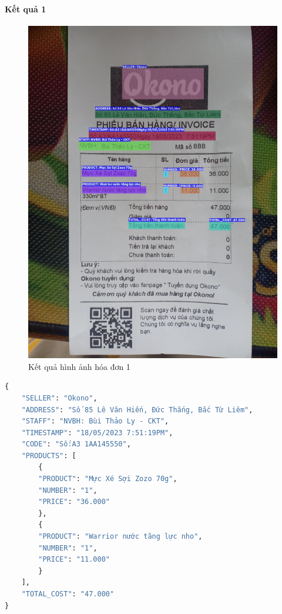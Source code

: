 \paragraph*{Kết quả 1}
\begin{figure}[h]
    \includegraphics[scale=0.2]{images/dem-image.png}
    \centering
    \caption{Kết quả hình ảnh hóa đơn 1}
\end{figure}

\begin{lstlisting}[language=Python]
{
    "SELLER": "Okono",
    "ADDRESS": "Số 85 Lê Văn Hiến, Đức Thắng, Bắc Từ Liêm",
    "STAFF": "NVBH: Bùi Thảo Ly - CKT",
    "TIMESTAMP": "18/05/2023 7:51:19PM",
    "CODE": "Số:A3 1AA145550",
    "PRODUCTS": [
        {
        "PRODUCT": "Mực Xé Sợi Zozo 70g",
        "NUMBER": "1",
        "PRICE": "36.000"
        },
        {
        "PRODUCT": "Warrior nước tăng lực nho",
        "NUMBER": "1",
        "PRICE": "11.000"
        }
    ],
    "TOTAL_COST": "47.000"
}
\end{lstlisting}

